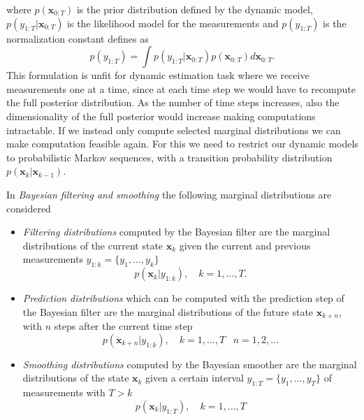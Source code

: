 where $p(\mathbf{x}_{0:T})$ is the prior distribution defined by the dynamic
model, $p(y_{1:T} | \mathbf{x}_{0:T})$ is the likelihood model for the
measurements and $p(y_{1:T})$ is the normalization constant defines as
$$ p(y_{1:T}) = \int p(y_{1:T} | \mathbf{x}_{0:T})
p(\mathbf{x}_{0:T}) d \mathbf{x}_{0:T}.$$
This formulation is unfit for dynamic estimation task where
we receive measurements one at a time, since
at each time step we would have to
recompute the full posterior distribution. As the number of
time steps increases, also the dimensionality of the full posterior
would increase making computations intractable.
If we instead only compute selected marginal distributions we can
make computation feasible again. For this we need to restrict
our dynamic models to probabilistic Markov sequences, with a
transition probability distribution $p(\mathbf{x}_k | \mathbf{x}_{k-1})$.

In \textit{Bayesian filtering and smoothing} the following marginal
distributions are considered

\begin{itemize}
\item \textit{Filtering distributions} computed by the
  Bayesian filter are the marginal distributions of the
  current state $\mathbf{x}_k$ given the current and previous measurements
  $y_{1:k} = \{y_1,...,y_k\}$
  $$ p(\mathbf{x}_k | y_{1:k}), \quad k = 1,...,T.$$
\item \textit{Prediction distributions} which can be computed with
  the prediction step of the Bayesian filter are the marginal
  distributions of the future state $\mathbf{x}_{k+n}$, with $n$ steps
  after the current time step
  $$ p(\mathbf{x}_{k+n} | y_{1:k}), \quad k = 1,...,T \;\;\; n = 1,2,...$$
\item \textit{Smoothing distributions} computed by the Bayesian smoother
  are the marginal distributions of the state $\mathbf{x}_k$ given
  a certain interval $y_{1:T} = \{y_1,...,y_T\}$ of measurements with
  $T > k$
  $$ p(\mathbf{x}_k | y_{1:T}), \quad k = 1,...,T$$
\end{itemize}

